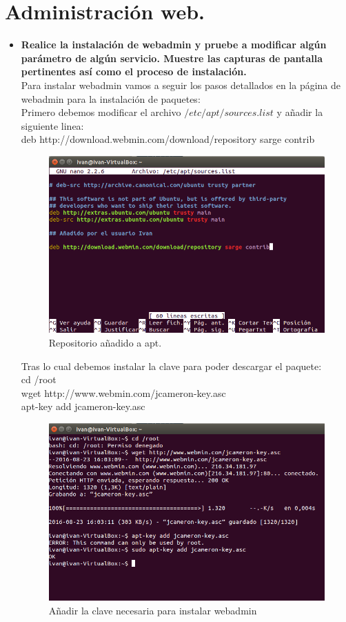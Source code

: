 \section{Administración web.}

\begin{itemize}
	\item \textbf{Realice la instalación de webadmin y pruebe a modificar algún parámetro de algún servicio. Muestre las capturas de pantalla pertinentes así como el proceso de instalación.}\\
	
	Para instalar webadmin vamos a seguir los pasos detallados en la página de webadmin para la instalación de paquetes\cite{webadminInstalation}:\\
	
	Primero debemos modificar el archivo $/etc/apt/sources.list$ y añadir la siguiente linea:\\
	
	deb http://download.webmin.com/download/repository sarge contrib\\
	
	\begin{figure}[H]
		\centering
		\includegraphics[width=0.7\linewidth]{AnadirRepo}
		\caption[AñadirRepo]{Repositorio añadido a apt.}
		\label{fig:AñadirRepo}
	\end{figure}
	
	Tras lo cual debemos instalar la clave para poder descargar el paquete:\\
	
	cd /root\\
	wget http://www.webmin.com/jcameron-key.asc\\
	apt-key add jcameron-key.asc\\
	
	\begin{figure}[H]
		\centering
		\includegraphics[width=0.7\linewidth]{AnadirClave}
		\caption[Añadir clave]{Añadir la clave necesaria para instalar webadmin}
		\label{fig:AnadirClave}
	\end{figure}


\end{itemize}
